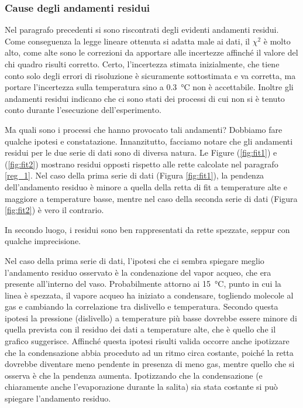\subsubsection{Cause degli andamenti residui}

Nel paragrafo precedenti si sono riscontrati degli evidenti andamenti residui. Come conseguenza la legge lineare ottenuta
si adatta male ai dati, il $\chi^2$ è molto alto, come alte sono le correzioni da apportare alle incertezze affinché 
il valore del chi quadro risulti corretto. Certo, l'incertezza stimata inizialmente, che tiene conto solo degli errori di risoluzione
è sicuramente sottostimata e va corretta, ma portare l'incertezza sulla temperatura sino a \SI{0.3}{\celsius} non è accettabile.
Inoltre gli andamenti residui indicano che ci sono stati dei processi di cui non si è tenuto conto durante l'esecuzione dell'esperimento.

Ma quali sono i processi che hanno provocato tali andamenti? Dobbiamo fare qualche ipotesi e constatazione. Innanzitutto,
facciamo notare che gli andamenti residui per le due serie di dati sono di diversa natura. Le Figure (\ref{fig:fit1}) e
(\ref{fig:fit2}) mostrano residui opposti rispetto alle rette calcolate nel paragrafo \ref{reg_1}. Nel caso della prima
serie di dati (Figura \ref{fig:fit1}), la pendenza dell'andamento residuo è minore a quella della retta di fit a
temperature alte e maggiore a temperature basse, mentre nel caso della seconda serie di dati (Figura \ref{fig:fit2}) è
vero il contrario.

In secondo luogo, i residui sono ben rappresentati da rette spezzate, seppur con qualche imprecisione.

Nel caso della prima serie di dati, l'ipotesi che ci sembra spiegare meglio l'andamento residuo osservato è la condenazione
del vapor acqueo, che era presente all'interno del vaso. Probabilmente attorno ai \SI{15}{\celsius}, punto in cui la linea
è spezzata, il vapore acqueo ha iniziato a condensare, togliendo molecole al gas e cambiando la correlazione tra dislivello e
temperatura. Secondo questa ipotesi la pressione (dislivello) a temperature più basse dovrebbe essere minore di quella prevista
con il residuo dei dati a temperature alte, che è quello che il grafico suggerisce.
Affinché questa ipotesi risulti valida occorre anche ipotizzare che la condensazione abbia proceduto ad un ritmo circa costante,
poiché la retta dovrebbe diventare meno pendente in presenza di meno gas, mentre quello che si osserva è che la pendenza aumenta.
Ipotizzando che la condensazione (e chiaramente anche l'evaporazione durante la salita) sia stata costante si può spiegare 
l'andamento residuo. 

